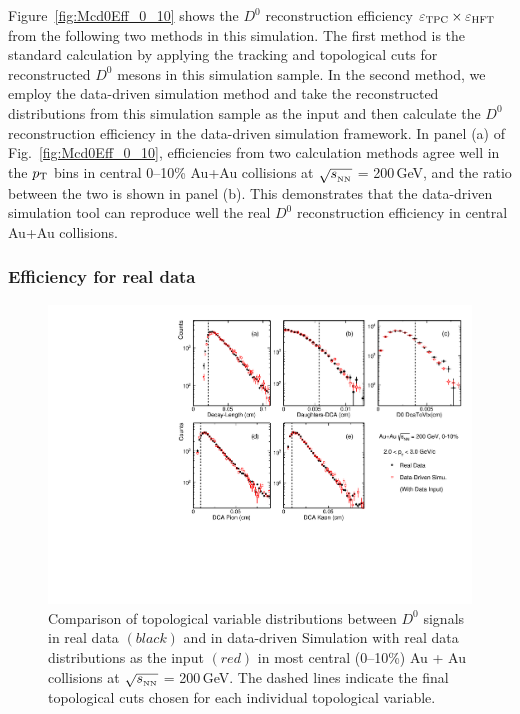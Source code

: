 \documentclass[%
 reprint,	
 amsmath,amssymb,
 aps,
 prc,
]{revtex4-1}
\begin{document}
Figure~\ref{fig:Mcd0Eff_0_10} shows the $D^0$ reconstruction efficiency $\varepsilon_{\rm TPC}\times\varepsilon_{\rm HFT}$ from the following two methods in this simulation. The first method is the standard calculation by applying the tracking and topological cuts for reconstructed $D^0$ mesons in this simulation sample. In the second method, we employ the data-driven simulation method and take the reconstructed distributions from this simulation sample as the input and then calculate the $D^0$ reconstruction efficiency in the data-driven simulation framework. In panel (a) of Fig.~\ref{fig:Mcd0Eff_0_10}, efficiencies from two calculation methods agree well in the $p_{\rm T}$ bins in central 0--10\% Au+Au collisions at $\sqrt{s_{_{\rm NN}}}$ = 200\,GeV, and the ratio between the two is shown in panel (b). This demonstrates that the data-driven simulation tool can reproduce well the real $D^0$ reconstruction efficiency in central Au+Au collisions.


\subsubsection{\label{sec:correction:hft:fordata}Efficiency for real data}

\begin{figure}
\centering
\includegraphics[width=1.0\textwidth]{fig/DataTopo.pdf}
\caption{Comparison of topological variable distributions between $D^0$ signals in real data $(black)$ and in data-driven Simulation with real data distributions as the input $(red)$ in most central (0--10\%) Au + Au collisions at $\sqrt{s_{_{\rm NN}}}$ = 200\,GeV. The dashed lines indicate the final topological cuts chosen for each individual topological variable.}
\label{fig:DataTopo} 
\end{figure}
\end{document}
